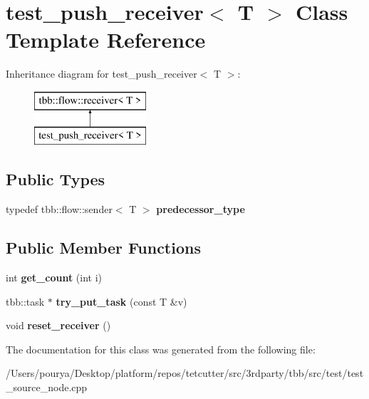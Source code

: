 \hypertarget{classtest__push__receiver}{}\section{test\+\_\+push\+\_\+receiver$<$ T $>$ Class Template Reference}
\label{classtest__push__receiver}
Inheritance diagram for test\+\_\+push\+\_\+receiver$<$ T $>$\+:\begin{figure}[H]
\begin{center}
\leavevmode
\includegraphics[height=2.000000cm]{classtest__push__receiver}
\end{center}
\end{figure}
\subsection*{Public Types}
\begin{DoxyCompactItemize}
\item 
\hypertarget{classtest__push__receiver_af4bae2794d9ed93bedc9ee17918c6327}{}typedef tbb\+::flow\+::sender$<$ T $>$ {\bfseries predecessor\+\_\+type}\label{classtest__push__receiver_af4bae2794d9ed93bedc9ee17918c6327}

\end{DoxyCompactItemize}
\subsection*{Public Member Functions}
\begin{DoxyCompactItemize}
\item 
\hypertarget{classtest__push__receiver_a34362d6efd1fe6674ecbd15fd2454309}{}int {\bfseries get\+\_\+count} (int i)\label{classtest__push__receiver_a34362d6efd1fe6674ecbd15fd2454309}

\item 
\hypertarget{classtest__push__receiver_ac620f5c53049785a6054234c4161f3cd}{}tbb\+::task $\ast$ {\bfseries try\+\_\+put\+\_\+task} (const T \&v)\label{classtest__push__receiver_ac620f5c53049785a6054234c4161f3cd}

\item 
\hypertarget{classtest__push__receiver_a7907b36b2926d6274405e420f66642ed}{}void {\bfseries reset\+\_\+receiver} ()\label{classtest__push__receiver_a7907b36b2926d6274405e420f66642ed}

\end{DoxyCompactItemize}


The documentation for this class was generated from the following file\+:\begin{DoxyCompactItemize}
\item 
/\+Users/pourya/\+Desktop/platform/repos/tetcutter/src/3rdparty/tbb/src/test/test\+\_\+source\+\_\+node.\+cpp\end{DoxyCompactItemize}
